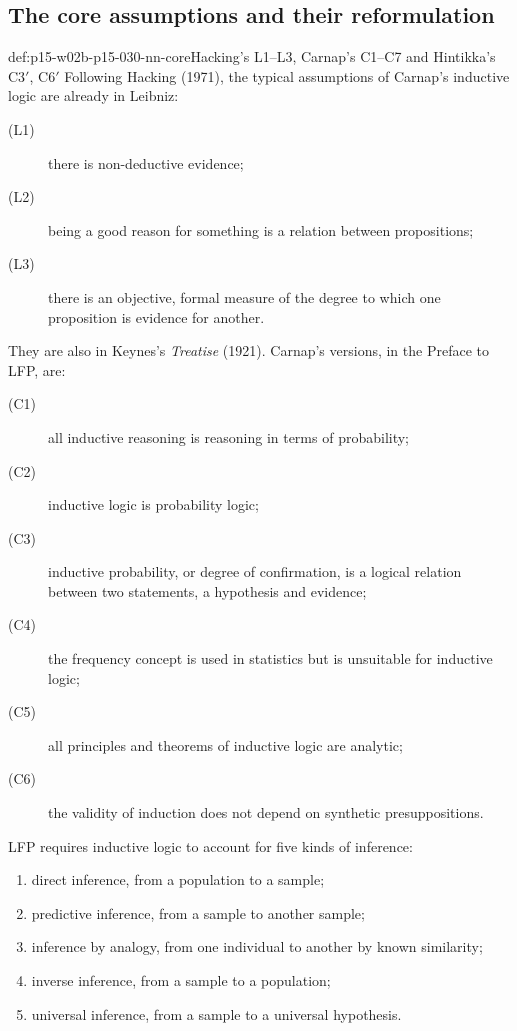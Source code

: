 \subsection{The core assumptions and their reformulation}
\label{sec:p15-w02b-p15-030-nn-core}

\begin{hbdefinition}{def:p15-w02b-p15-030-nn-core}{Hacking's L1--L3, Carnap's C1--C7 and Hintikka's C3\('\), C6\('\)}
Following Hacking (1971), the typical assumptions of Carnap's inductive
logic are already in Leibniz:
\begin{description}
\item[(L1)] there is non-deductive evidence;
\item[(L2)] being a good reason for something is a relation between
  propositions;
\item[(L3)] there is an objective, formal measure of the degree to which
  one proposition is evidence for another.
\end{description}
They are also in Keynes's \emph{Treatise} (1921). Carnap's versions, in
the Preface to LFP, are:
\begin{description}
\item[(C1)] all inductive reasoning is reasoning in terms of probability;
\item[(C2)] inductive logic is probability logic;
\item[(C3)] inductive probability, or degree of confirmation, is a
  logical relation between two statements, a hypothesis and evidence;
\item[(C4)] the frequency concept is used in statistics but is unsuitable
  for inductive logic;
\item[(C5)] all principles and theorems of inductive logic are analytic;
\item[(C6)] the validity of induction does not depend on synthetic
  presuppositions.
\end{description}
LFP requires inductive logic to account for five kinds of inference:
\begin{enumerate}[label=(\alph*)]
\item direct inference, from a population to a sample;
\item predictive inference, from a sample to another sample;
\item inference by analogy, from one individual to another by known
  similarity;
\item inverse inference, from a sample to a population;
\item universal inference, from a sample to a universal hypothesis.

\end{enumerate}
\end{hbdefinition}
